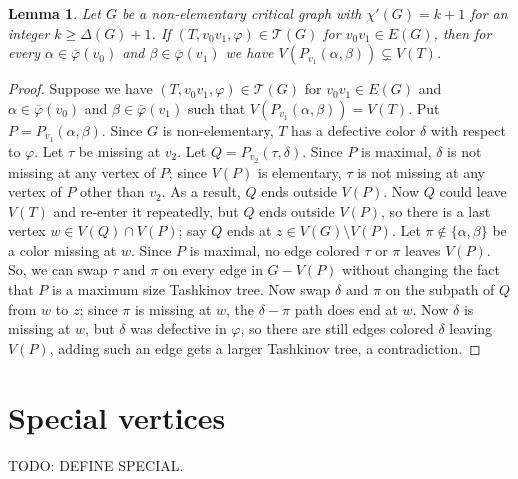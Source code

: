 \documentclass[12pt]{amsart}
\theoremstyle{plain}
\newtheorem{lem}[thm]{Lemma}
\theoremstyle{definition}
\theoremstyle{remark}
\newcommand{\fancy}[1]{\mathcal{#1}}
\newcommand{\T}{\fancy{T}}
\newcommand{\parens}[1]{\left( #1 \right)}
\newcommand{\vph}{\varphi}
\newcommand{\vphn}{\overline{\varphi}}
\begin{document}
\begin{lem}\label{FreeColorsLemma}
Let $G$ be a non-elementary critical graph with $\chi'(G) = k+1$ for an integer $k \ge \Delta(G) + 1$.
If $(T, v_0v_1, \vph) \in \T(G)$ for $v_0v_1 \in E(G)$, then for every $\alpha \in \vphn(v_0)$ and $\beta \in \vphn(v_1)$ we have $V\parens{P_{v_1}(\alpha, \beta)} \subsetneq V(T)$.
\end{lem}
\begin{proof}
Suppose we have $(T, v_0v_1, \vph) \in \T(G)$ for $v_0v_1 \in E(G)$ and $\alpha \in \vphn(v_0)$ and $\beta \in \vphn(v_1)$ such that $V\parens{P_{v_1}(\alpha, \beta)} = V(T)$.
Put $P = P_{v_1}(\alpha, \beta)$.  Since $G$ is non-elementary, $T$ has a defective color $\delta$ with respect to $\vph$. Let $\tau$ be
missing at $v_2$. Let $Q = P_{v_2}(\tau, \delta)$.
Since $P$ is maximal, $\delta$ is not missing at any vertex of $P$;
since $V(P)$ is elementary, $\tau$ is not missing at any vertex of $P$ other 
than $v_2$.  As a result, $Q$ ends outside $V(P)$.  Now $Q$ could leave
$V(T)$ and re-enter it repeatedly, but $Q$ ends outside $V(P)$, so there is a last vertex $w \in V(Q) \cap V(P)$;
say $Q$ ends at $z \in V(G)\setminus V(P)$.  Let $\pi \notin \{\alpha, \beta\}$ be a
color missing at $w$.  Since
$P$ is maximal, no edge colored $\tau$ or $\pi$ leaves $V(P)$.  So, we can
swap $\tau$ and $\pi$ on every edge in $G - V(P)$ without changing the fact that
$P$ is a maximum size Tashkinov tree.  Now swap $\delta$ and $\pi$ on the
subpath of $Q$ from $w$ to $z$;
since $\pi$ is missing at $w$, the $\delta-\pi$ path does end at $w$.  Now
$\delta$ is missing at $w$, but $\delta$ was defective in $\vph$, so there are
still edges colored $\delta$ leaving $V(P)$, adding such an edge gets a larger
Tashkinov tree, a contradiction.
\end{proof}


\section{Special vertices}
TODO: DEFINE SPECIAL.
\end{document}
